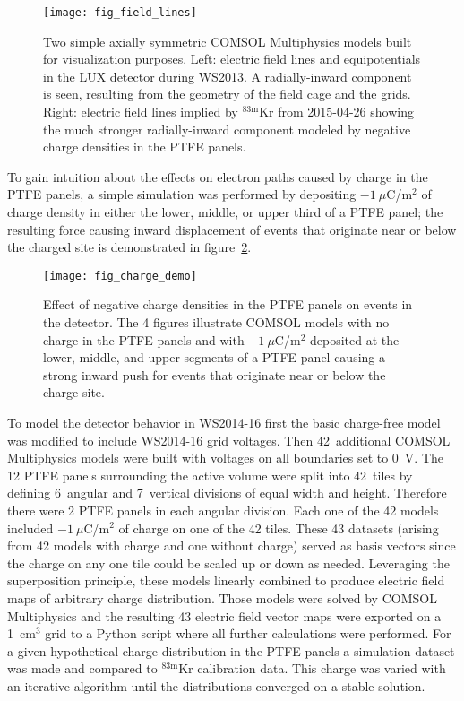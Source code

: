 \documentclass[11pt,a4paper]{article}
\newcommand{\isot}[2]{$^{\textrm{#2}}$#1 }
\newcommand{\krm}{\isot{Kr}{83m}}
\begin{document}
\begin{figure}[ht!]
\begin{center}
\texttt{[image: fig\_field\_lines]}
\caption{Two simple axially symmetric \textsc{COMSOL} Multiphysics models built for visualization purposes. Left: electric field lines and equipotentials in the LUX detector during WS2013. A radially-inward component is seen, resulting from the geometry of the field cage and the grids. Right: electric field lines implied by \krm from 2015-04-26 showing the much stronger radially-inward component modeled by negative charge densities in the PTFE panels.}
\label{fig:field_lines}
\end{center} 
\end{figure}

To gain intuition about the effects on electron paths caused by charge in the PTFE panels, a simple simulation was performed by depositing $-1~\mu$C/m$^2$ of charge density in either the lower, middle, or upper third of a PTFE panel; the resulting force causing inward displacement of events that originate near or below the charged site is demonstrated in figure~\ref{fig:charge_demo}.

\begin{figure}[ht!]
\begin{center}
\texttt{[image: fig\_charge\_demo]}
\caption{Effect of negative charge densities in the PTFE panels on events in the detector. The 4 figures illustrate \textsc{COMSOL} models with no charge in the PTFE panels and with $-1~\mu$C/m$^2$ deposited at the lower, middle, and upper segments of a PTFE panel causing a strong inward push for events that originate near or below the charge site.}
\label{fig:charge_demo}
\end{center} 
\end{figure}

To model the detector behavior in WS2014-16 first the basic charge-free model was modified to include WS2014-16 grid voltages. Then 42~additional \textsc{COMSOL} Multiphysics models were built with voltages on all boundaries set to 0~V. The 12 PTFE panels surrounding the active volume were split into 42~tiles by defining 6~angular and 7~vertical divisions of equal width and height. Therefore there were 2 PTFE panels in each angular division. Each one of the 42 models included $-1~\mu$C/m$^2$ of charge on one of the 42 tiles. These 43 datasets (arising from 42 models with charge and one without charge) served as basis vectors since the charge on any one tile could be scaled up or down as needed. Leveraging the superposition principle, these models linearly combined to produce electric field maps of arbitrary charge distribution. Those models were solved by \textsc{COMSOL} Multiphysics and the resulting 43 electric field vector maps were exported on a 1~cm$^3$ grid to a Python script where all further calculations were performed. For a given hypothetical charge distribution in the PTFE panels a simulation dataset was made and compared to \krm calibration data. This charge was varied with an iterative algorithm until the distributions converged on a stable solution.
\end{document}

